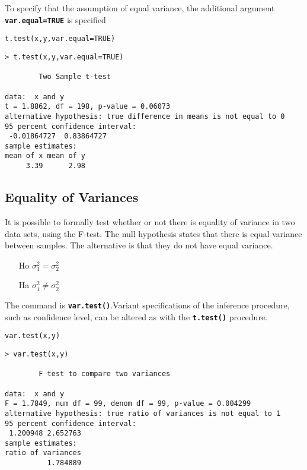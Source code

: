 To specify that the assumption of equal variance, the additional argument \textbf{\texttt{var.equal=TRUE}} is specified

\begin{framed}
\begin{verbatim}
t.test(x,y,var.equal=TRUE)
\end{verbatim}

\end{framed}

\begin{verbatim}
> t.test(x,y,var.equal=TRUE)

        Two Sample t-test

data:  x and y
t = 1.8862, df = 198, p-value = 0.06073
alternative hypothesis: true difference in means is not equal to 0
95 percent confidence interval:
 -0.01864727  0.83864727
sample estimates:
mean of x mean of y
     3.39      2.98
\end{verbatim}

\subsection{Equality of Variances}
It is possible to formally test whether or not there is equality of variance in two data sets, using the F-test.
The null hypothesis states that there is equal variance between samples. The alternative is that they do not have equal variance.
\begin{itemize}
\item[Ho] $\sigma^2_1 = \sigma^2_2$
\item[Ha] $\sigma^2_1 \neq \sigma^2_2$
\end{itemize}

The command is \textbf{\texttt{var.test()}}.Variant specifications of the inference procedure, such as confidence level, can be altered as with the \texttt{\textbf{t.test()}} procedure.
\begin{framed}
\begin{verbatim}
var.test(x,y)
\end{verbatim}
\end{framed}
\begin{verbatim}
> var.test(x,y)

        F test to compare two variances

data:  x and y
F = 1.7849, num df = 99, denom df = 99, p-value = 0.004299
alternative hypothesis: true ratio of variances is not equal to 1
95 percent confidence interval:
 1.200948 2.652763
sample estimates:
ratio of variances
          1.784889
\end{verbatim}


